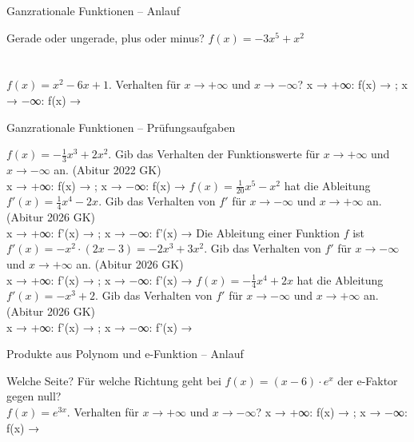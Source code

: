 \setcounter{aufgabe}{54}

\begin{aufgabe}{Ganzrationale Funktionen – Anlauf}
\begin{teile}
\teil Gerade oder ungerade, plus oder minus? $f(x) = -3x^5 + x^2$  \\  \\  \\ 
\teil $f(x) = x^2 - 6x + 1$. Verhalten für $x \to +\infty$ und $x \to -\infty$? x → +∞: f(x) → \leerfeld ; x → −∞: f(x) → \leerfeld
\end{teile}
\end{aufgabe}

\begin{aufgabe}{Ganzrationale Funktionen – Prüfungsaufgaben}
\begin{teile}
\teil $f(x) = -\frac{1}{3}x^3 + 2x^2$. Gib das Verhalten der Funktionswerte für $x \to +\infty$ und $x \to -\infty$ an. \hfill (Abitur 2022 GK) \\ x → +∞: f(x) → \leerfeld ; x → −∞: f(x) → \leerfeld
\teil $f(x) = \frac{1}{20}x^5 - x^2$ hat die Ableitung $f'(x) = \frac{1}{4}x^4 - 2x$. Gib das Verhalten von $f'$ für $x \to -\infty$ und $x \to +\infty$ an. \hfill (Abitur 2026 GK) \\ x → +∞: f'(x) → \leerfeld ; x → −∞: f'(x) → \leerfeld
\teil Die Ableitung einer Funktion $f$ ist $f'(x) = -x^2 \cdot (2x - 3) = -2x^3 + 3x^2$. Gib das Verhalten von $f'$ für $x \to -\infty$ und $x \to +\infty$ an. \hfill (Abitur 2026 GK) \\ x → +∞: f'(x) → \leerfeld ; x → −∞: f'(x) → \leerfeld
\teil $f(x) = -\frac{1}{4}x^4 + 2x$ hat die Ableitung $f'(x) = -x^3 + 2$. Gib das Verhalten von $f'$ für $x \to -\infty$ und $x \to +\infty$ an. \hfill (Abitur 2026 GK) \\ x → +∞: f'(x) → \leerfeld ; x → −∞: f'(x) → \leerfeld
\end{teile}
\end{aufgabe}

\begin{aufgabe}{Produkte aus Polynom und e-Funktion – Anlauf}
\begin{teile}
\teil Welche Seite? Für welche Richtung geht bei $f(x) = (x - 6) \cdot e^{x}$ der e-Faktor gegen null?  \\ 
\teil $f(x) = e^{3x}$. Verhalten für $x \to +\infty$ und $x \to -\infty$? x → +∞: f(x) → \leerfeld ; x → −∞: f(x) → \leerfeld
\end{teile}
\end{aufgabe}

